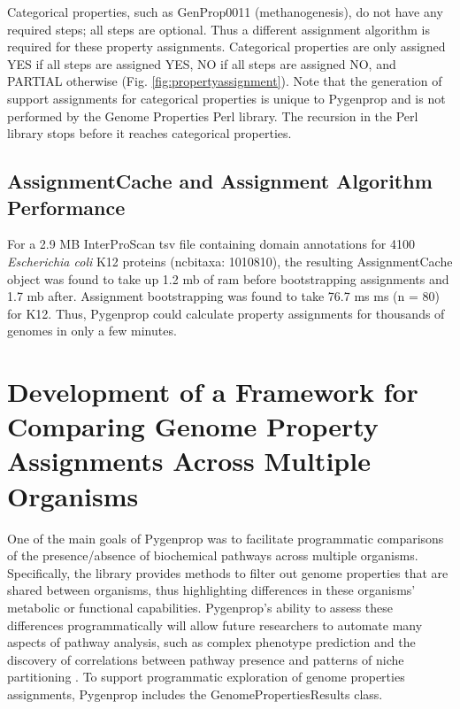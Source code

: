 Categorical properties, such as GenProp0011 (methanogenesis), do not have any 
required steps; all steps are optional. Thus a different assignment algorithm is 
required for these property assignments. Categorical properties are only 
assigned YES if all steps are assigned YES, NO if all steps are assigned NO, and 
PARTIAL otherwise (Fig. \ref{fig:propertyassignment}). Note that the generation 
of support assignments for categorical properties is unique to Pygenprop and is 
not performed by the Genome Properties Perl library. The recursion in the Perl 
library stops before it reaches categorical properties.

\subsection{AssignmentCache and Assignment Algorithm Performance} 
\label{AssignmentCache-Performance}

For a 2.9 MB InterProScan \gls{tsv} file containing domain annotations for 4100 
\textit{Escherichia coli} K12 proteins (\gls{ncbitaxa}: 1010810), the resulting 
AssignmentCache object was found to take up 1.2 \gls{mb} of \gls{ram} before 
bootstrapping assignments and 1.7 \gls{mb} after. Assignment bootstrapping was 
found to take 76.7 ms  ms (\gls{n} = 80) for K12. Thus, Pygenprop 
could calculate property assignments for thousands of genomes in only a few 
minutes. %

\section{Development of a Framework for Comparing Genome Property Assignments 
Across Multiple Organisms} \label{GenomePropertiesResults}

One of the main goals of Pygenprop was to facilitate programmatic comparisons of 
the presence/absence of biochemical pathways across multiple organisms. 
Specifically, the library provides methods to filter out genome properties that are 
shared between organisms, thus highlighting differences in these organisms' 
metabolic or functional capabilities. Pygenprop's ability to assess these 
differences programmatically will allow future researchers to automate many 
aspects of pathway analysis, such as complex phenotype prediction and the 
discovery of correlations between pathway presence and patterns of niche 
partitioning \cite{finke2008niche}. To support programmatic exploration of 
genome properties assignments, Pygenprop includes the GenomePropertiesResults 
class. 

